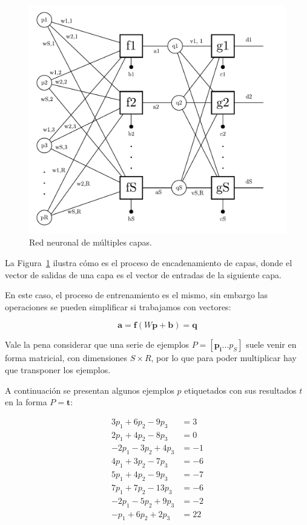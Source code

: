 \documentclass{article}
\begin{document}
\begin{figure}[htbp]
    \centering
    \includegraphics[width=\textwidth]{multi-layer-NN.pdf}
    \caption{Red neuronal de múltiples capas.}
    \label{fig:mlp}
\end{figure}

La Figura~\ref{fig:mlp} ilustra cómo es el proceso de encadenamiento de capas, donde el vector de salidas de una capa es el vector de entradas de la siguiente capa.

En este caso, el proceso de entrenamiento es el mismo, sin embargo las operaciones se pueden simplificar si trabajamos con vectores:

\begin{equation}
    \mathbf{a} = \mathbf{f}\left( W\mathbf{p} + \mathbf{b} \right) = \mathbf{q}
\end{equation}

Vale la pena considerar que una serie de ejemplos $P = \left[ \mathbf{p_i} \dots p_S \right]$ suele venir en forma matricial, con dimensiones $S \times R$, por lo que para poder multiplicar hay que transponer los ejemplos.

A continuación se presentan algunos ejemplos $p$ etiquetados con sus resultados $t$ en la forma $P = \mathbf{t}$:

\begin{align}
    3p_1 + 6p_2 - 9p_3 & = 3 \\
    2p_1 + 4p_2 - 8p_3 & = 0 \\
   -2p_1 - 3p_2 + 4p_3 & = -1 \\
    4p_1 + 3p_2 - 7p_3 & = -6 \\
    5p_1 + 4p_2 - 9p_3 & = -7 \\
    7p_1 + 7p_2 - 13p_3 & = -6 \\
   -2p_1 - 5p_2 + 9p_3 & = -2 \\
    -p_1 + 6p_2 + 2p_3 & = 22
\end{align}
\end{document}
